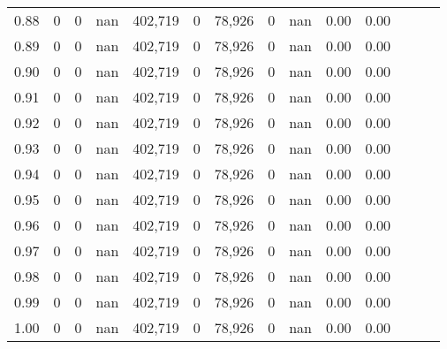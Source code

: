 \begin{tabular}{rrrrrrrrrrrrrr}
0.88 &        0 &       0 &   nan &  402,719 &        0 &  78,926 &       0 &   nan &  0.00 &      0.00 \\
0.89 &        0 &       0 &   nan &  402,719 &        0 &  78,926 &       0 &   nan &  0.00 &      0.00 \\
0.90 &        0 &       0 &   nan &  402,719 &        0 &  78,926 &       0 &   nan &  0.00 &      0.00 \\
0.91 &        0 &       0 &   nan &  402,719 &        0 &  78,926 &       0 &   nan &  0.00 &      0.00 \\
0.92 &        0 &       0 &   nan &  402,719 &        0 &  78,926 &       0 &   nan &  0.00 &      0.00 \\
0.93 &        0 &       0 &   nan &  402,719 &        0 &  78,926 &       0 &   nan &  0.00 &      0.00 \\
0.94 &        0 &       0 &   nan &  402,719 &        0 &  78,926 &       0 &   nan &  0.00 &      0.00 \\
0.95 &        0 &       0 &   nan &  402,719 &        0 &  78,926 &       0 &   nan &  0.00 &      0.00 \\
0.96 &        0 &       0 &   nan &  402,719 &        0 &  78,926 &       0 &   nan &  0.00 &      0.00 \\
0.97 &        0 &       0 &   nan &  402,719 &        0 &  78,926 &       0 &   nan &  0.00 &      0.00 \\
0.98 &        0 &       0 &   nan &  402,719 &        0 &  78,926 &       0 &   nan &  0.00 &      0.00 \\
0.99 &        0 &       0 &   nan &  402,719 &        0 &  78,926 &       0 &   nan &  0.00 &      0.00 \\
1.00 &        0 &       0 &   nan &  402,719 &        0 &  78,926 &       0 &   nan &  0.00 &      0.00 \\
\bottomrule
\end{tabular}
